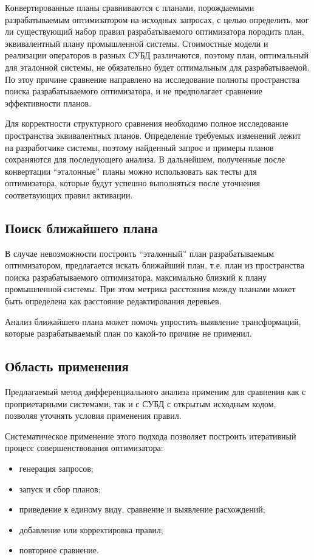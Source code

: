 \documentclass[fontsize=14pt, russian]{scrartcl}
\begin{document}
Конвертированные планы сравниваются с планами, порождаемыми разрабатываемым
оптимизатором на исходных запросах, с целью определить, мог ли существующий
набор правил разрабатываемого оптимизатора породить план, эквивалентный плану
промышленной системы. Стоимостные модели и реализации операторов в разных СУБД
различаются, поэтому план, оптимальный для эталонной системы, не обязательно
будет оптимальным для разрабатываемой. По этоу причине сравнение направлено на
исследование полноты пространства поиска разрабатываемого оптимизатора, и не
предполагает сравнение эффективности планов.

Для корректности структурного сравнения необходимо полное исследование
пространства эквивалентных планов. Определение требуемых изменений лежит на
разработчике системы, поэтому найденный запрос и примеры планов сохраняются для
последующего анализа. В дальнейшем, полученные после конвертации ``эталонные''
планы можно использовать как тесты для оптимизатора, которые будут успешно
выполняться после уточнения соответвующих правил активации.

\subsection{Поиск ближайшего плана}

В случае невозможности построить ``эталонный'' план разрабатываемым
оптимизатором, предлагается искать ближайший план, т.е. план из пространства
поиска разрабатываемого оптимизатора, максимально близкий к плану промышленной
системы. При этом метрика расстояния между планами может быть определена как
расстояние редактирования деревьев.

Анализ ближайшего плана может помочь упростить выявление трансформаций, которые
разрабатываемый план по какой-то причине не применил.

\subsection{Область применения}

Предлагаемый метод дифференциального анализа применим для сравнения как с
проприетарными системами, так и с СУБД с открытым исходным кодом, позволяя
уточнять условия применения правил.

Систематическое применение этого подхода позволяет построить итеративный процесс
совершенствования оптимизатора:

\begin{itemize}
  \item генерация запросов;
  \item запуск и сбор планов;
  \item приведение к единому виду, сравнение и выявление расхождений;
  \item добавление или корректировка правил;
  \item повторное сравнение.
\end{itemize}
\end{document}
